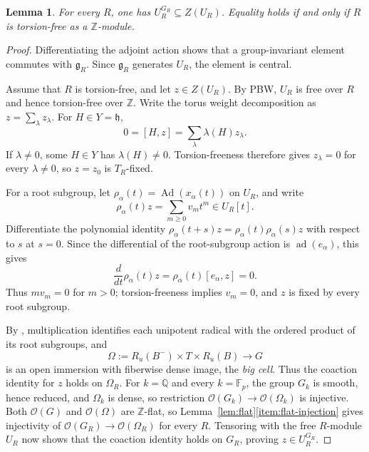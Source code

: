 \documentclass[twoside,a4paper,12pt,reqno]{amsart}
\newtheorem{lemma}[theorem]{Lemma}
\theoremstyle{remark}
\numberwithin{equation}{section}
\newcommand{\Z}{\mathbb Z}
\newcommand{\Q}{\mathbb Q}
\newcommand{\F}{\mathbb F}
\newcommand{\cO}{\mathcal O}
\newcommand{\fg}{\mathfrak g}
\newcommand{\fh}{\mathfrak h}
\DeclareMathOperator{\Ad}{Ad}
\begin{document}
\begin{lemma}\label{lem:center}
For every \(R\), one has \(U_R^{G_R}\subseteq Z(U_R)\). Equality holds if and only if \(R\) is torsion-free as a \(\Z\)-module.
\end{lemma}
\begin{proof}
Differentiating the adjoint action shows that a group-invariant element commutes with \(\fg_R\). Since \(\fg_R\) generates \(U_R\), the element is central.

Assume that \(R\) is torsion-free, and let \(z\in Z(U_R)\). By PBW, \(U_R\) is free over \(R\) and hence torsion-free over \(\Z\). Write the torus weight decomposition as \(z=\sum_\lambda z_\lambda\). For \(H\in Y=\fh\),
\[
0=[H,z]=\sum_\lambda\lambda(H)z_\lambda.
\]
If \(\lambda\ne0\), some \(H\in Y\) has \(\lambda(H)\ne0\). Torsion-freeness therefore gives \(z_\lambda=0\) for every \(\lambda\ne0\), so \(z=z_0\) is \(T_R\)-fixed.

For a root subgroup, let \(\rho_\alpha(t)=\Ad(x_\alpha(t))\) on \(U_R\), and write
\[
\rho_\alpha(t)z=\sum_{m\ge0}v_mt^m\in U_R[t].
\]
Differentiate the polynomial identity
\(\rho_\alpha(t+s)z=\rho_\alpha(t)\rho_\alpha(s)z\) with respect to \(s\) at \(s=0\). Since the differential of the root-subgroup action is \(\operatorname{ad}(e_\alpha)\), this gives
\[
\frac{d}{dt}\rho_\alpha(t)z
=\rho_\alpha(t)[e_\alpha,z]=0.
\]
Thus \(m v_m=0\) for \(m>0\); torsion-freeness implies \(v_m=0\), and \(z\) is fixed by every root subgroup.

By \cite[Thm.~5.1.13]{Conrad}, multiplication identifies each unipotent radical with the ordered product of its root subgroups, and
\[
\Omega:=R_u(B^-)\times T\times R_u(B)\longrightarrow G
\]
is an open immersion with fiberwise dense image, the \emph{big cell}. Thus the coaction identity for \(z\) holds on \(\Omega_R\). For \(k=\Q\) and every \(k=\F_p\), the group \(G_k\) is smooth, hence reduced, and \(\Omega_k\) is dense, so restriction \(\cO(G_k)\to\cO(\Omega_k)\) is injective. Both \(\cO(G)\) and \(\cO(\Omega)\) are \(\Z\)-flat, so Lemma~\ref{lem:flat}\eqref{item:flat-injection} gives injectivity of \(\cO(G_R)\to\cO(\Omega_R)\) for every \(R\). Tensoring with the free \(R\)-module \(U_R\) now shows that the coaction identity holds on \(G_R\), proving \(z\in U_R^{G_R}\).


\end{proof}
\end{document}
